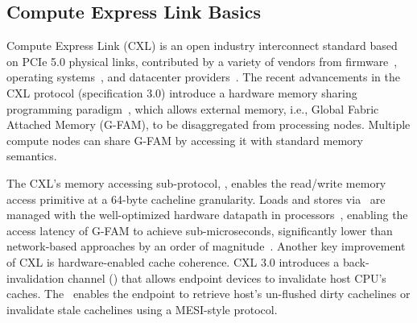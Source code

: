 




\subsection{Compute Express Link Basics}



Compute Express Link (CXL) is an open industry interconnect standard based on PCIe 5.0 physical links, contributed by a variety of vendors from firmware~\cite{samsung, samsung_2}, operating systems~\cite{tpp_asplos23}, and datacenter providers~\cite{tpp_asplos23, pond}. The recent advancements in the CXL protocol (specification 3.0) introduce a hardware memory sharing programming paradigm~\cite{cxl-doc, cxl-shortdoc, cxl-paper}, which allows external memory, i.e., Global Fabric Attached Memory (G-FAM), to be disaggregated from processing nodes. Multiple compute nodes can share G-FAM by accessing it with standard memory semantics.


The CXL's memory accessing sub-protocol, \cxlmem, enables the read/write memory access primitive at a 64-byte cacheline granularity. Loads and stores via \cxlmem~are managed with the well-optimized hardware datapath in processors~\cite{quantitative_approach, book_cc}, enabling the access latency of G-FAM to achieve sub-microseconds, significantly lower than network-based approaches by an order of magnitude~\cite{legoos_atc19, gam, txcache_osdi10, learned_cache}. Another key improvement of CXL is hardware-enabled cache coherence. CXL 3.0 introduces a back-invalidation channel (\cxlbi) that allows endpoint devices to invalidate host CPU's caches. The \cxlbi~enables the endpoint to retrieve host's un-flushed dirty cachelines or invalidate stale cachelines using a MESI-style protocol.


